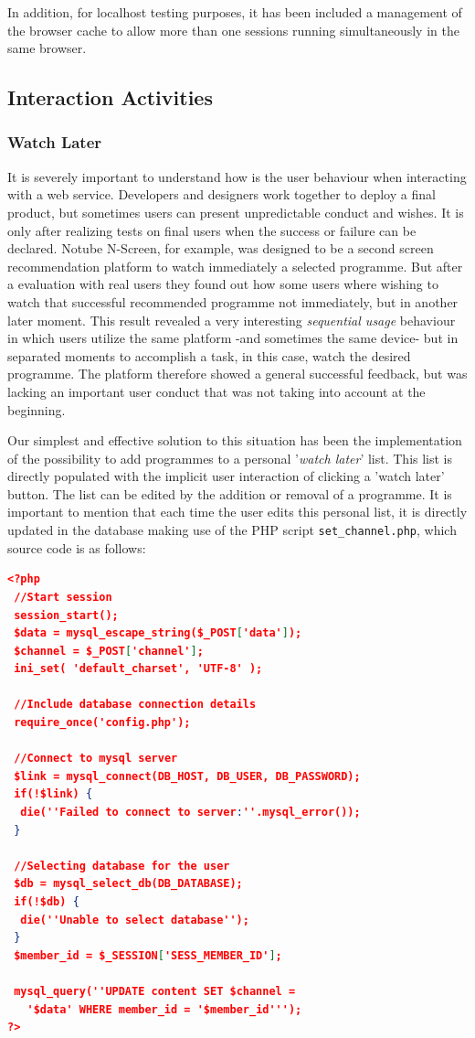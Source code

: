 \documentclass{acm_proc_article-sp}
\begin{document}
In addition, for localhost testing purposes, it has been included a management of the browser cache to allow more than one sessions running simultaneously in the same browser.

\subsection{Interaction Activities}
\subsubsection{Watch Later} \label{watchlater}
It is severely important to understand how is the user behaviour when interacting with a web service. Developers and designers work together to deploy a final product, but sometimes users can present unpredictable conduct and wishes\cite{norman2002design}. It is only after realizing tests on final users when the success or failure can be declared. Notube N-Screen, for example, was designed to be a second screen recommendation platform to watch immediately a selected programme. But after a evaluation with real users they found out how some users where wishing to watch that successful recommended programme not immediately, but in another later moment. This result revealed a very interesting \textit{sequential usage} behaviour in which users utilize the same platform -and sometimes the same device- but in separated moments to accomplish a task, in this case, watch the desired programme. The platform therefore showed a general successful feedback, but was lacking an important user conduct that was not taking into account at the beginning. 

Our simplest and effective solution to this situation\cite{krug2014don} has been the implementation of the possibility to add programmes to a personal '\textit{watch later}' list. This list is directly populated with the implicit user interaction of clicking a 'watch later' button. The list can be edited by the addition or removal of a programme. It is important to mention that each time the user edits this personal list, it is directly updated in the database making use of the PHP script \texttt{set\_channel.php}, which source code is as follows:

\begin{lstlisting}[language=json,firstnumber=1]
<?php
 //Start session
 session_start();
 $data = mysql_escape_string($_POST['data']);
 $channel = $_POST['channel'];
 ini_set( 'default_charset', 'UTF-8' );
	
 //Include database connection details
 require_once('config.php');

 //Connect to mysql server
 $link = mysql_connect(DB_HOST, DB_USER, DB_PASSWORD);
 if(!$link) {
  die(''Failed to connect to server:''.mysql_error());
 }
	
 //Selecting database for the user
 $db = mysql_select_db(DB_DATABASE);
 if(!$db) {
  die(''Unable to select database'');
 }
 $member_id = $_SESSION['SESS_MEMBER_ID'];

 mysql_query(''UPDATE content SET $channel = 
   '$data' WHERE member_id = '$member_id''');
?>
\end{lstlisting}
\end{document}
